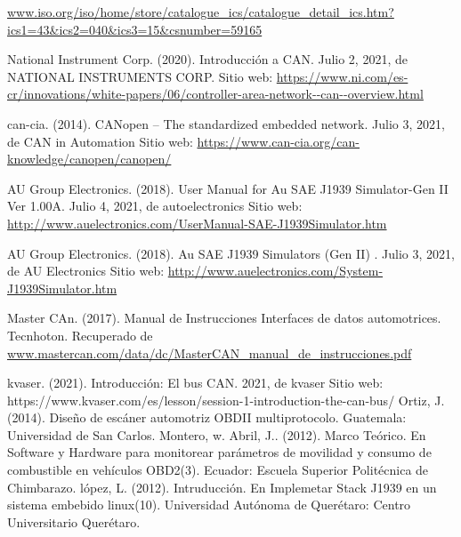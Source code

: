 \begin{thebibliography}{99}
 \url{www.iso.org/iso/home/store/catalogue_ics/catalogue_detail_ics.htm?ics1=43&ics2=040&ics3=15&csnumber=59165}

 National Instrument Corp. (2020). Introducción a CAN. Julio 2, 2021, de NATIONAL INSTRUMENTS CORP. Sitio web: \url{ https://www.ni.com/es-cr/innovations/white-papers/06/controller-area-network--can--overview.html}

 can-cia. (2014). CANopen – The standardized embedded network. Julio 3, 2021, de CAN in Automation Sitio web: \url{ https://www.can-cia.org/can-knowledge/canopen/canopen/}

 AU Group Electronics. (2018). User Manual for Au SAE J1939 Simulator-Gen II Ver 1.00A. Julio 4, 2021, de autoelectronics Sitio web: \url{ http://www.auelectronics.com/UserManual-SAE-J1939Simulator.htm}


 AU Group Electronics. (2018). Au SAE J1939 Simulators (Gen II) . Julio 3, 2021, de AU Electronics Sitio web: \url{ http://www.auelectronics.com/System-J1939Simulator.htm}


 Master CAn. (2017). Manual de Instrucciones Interfaces de datos automotrices. Tecnhoton. Recuperado de  \url{www.mastercan.com/data/dc/MasterCAN_manual_de_instrucciones.pdf}

  kvaser. (2021). Introducción: El bus CAN. 2021, de kvaser Sitio web: https://www.kvaser.com/es/lesson/session-1-introduction-the-can-bus/
 Ortiz, J. (2014). Diseño de escáner automotriz OBDII multiprotocolo. Guatemala: Universidad de San Carlos.
 Montero, w. Abril, J.. (2012). Marco Teórico. En Software y Hardware para monitorear parámetros de movilidad y consumo de combustible en vehículos OBD2(3). Ecuador: Escuela Superior Politécnica de Chimbarazo. 
 lópez, L. (2012). Intruducción. En Implemetar Stack J1939 en un sistema embebido linux(10). Universidad Autónoma de Querétaro: Centro Universitario Querétaro.



\end{thebibliography}
